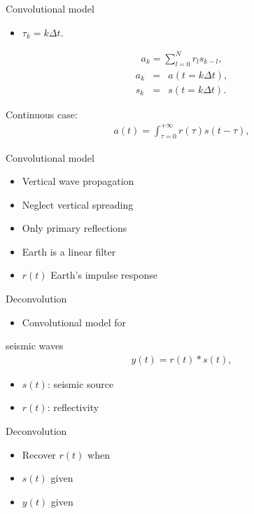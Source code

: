 \documentclass[xcolor=dvipsnames,notes]{beamer}
\begin{document}
%
\begin{frame}{Convolutional model}
\sf\Large
 \begin{itemize}
  \item $\tau_k=k\Delta t$.
 \end{itemize}
%
\begin{eqnarray}
  a_k = \sum^N_{l=0} r_l s_{k-l},
\label{eq:3-64}
\end{eqnarray}
\begin{eqnarray}
  a_k & = & a(t=k\Delta t)\nonumber,\\
  s_k & = & s(t=k\Delta t).
\end{eqnarray}

Continuous case:
%
\begin{eqnarray}
 a(t)=\int^{+\infty}_{\tau=0} r(\tau)s(t-\tau),
\label{eq:3-65}
\end{eqnarray}
%
\end{frame}
%
\begin{frame}{Convolutional model}
%
\begin{itemize}
  \item Vertical wave propagation
  \item Neglect vertical spreading
  \item Only primary reflections
   \item Earth is a linear filter
   \item $r(t)$ Earth's impulse response
 \end{itemize}
\end{frame}
%
\begin{frame}{Deconvolution}
\begin{itemize}
\item Convolutional model for
\end{itemize}
seismic waves 
%
\begin{eqnarray}
  y(t)=r(t)*s(t),
      \label{eq:cmodel}
\end{eqnarray}
%
\begin{itemize}
\item $s(t)$: seismic source 
\item $r(t)$: reflectivity
\end{itemize}
\end{frame}
%
\begin{frame}{Deconvolution}
\sf\Large
\begin{itemize}
\item Recover $r(t)$ when
\item $s(t)$ given
\item $y(t)$ given
\end{itemize}
\end{frame}
\end{document}
